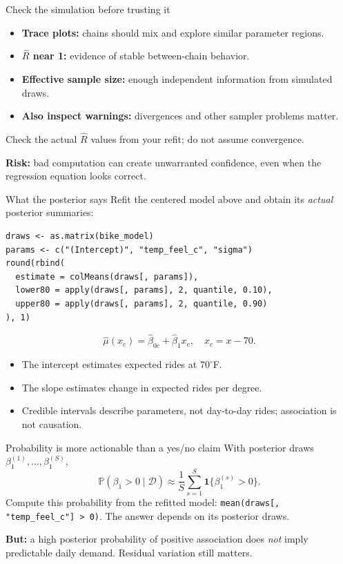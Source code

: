 \documentclass[aspectratio=43,11pt]{beamer}
\newcommand{\Prob}{\mathbb{P}}
\newcommand{\dd}{\mathcal D}
\begin{document}
\begin{frame}{Check the simulation before trusting it}
\begin{itemize}
\item \textbf{Trace plots:} chains should mix and explore similar parameter regions.
\item \textbf{$\widehat R$ near 1:} evidence of stable between-chain behavior.
\item \textbf{Effective sample size:} enough independent information from simulated draws.
\item \textbf{Also inspect warnings:} divergences and other sampler problems matter.
\end{itemize}
Check the actual $\widehat R$ values from your refit; do not assume convergence.
\par\medskip\textbf{Risk:} bad computation can create unwarranted confidence, even when the regression equation looks correct.
\end{frame}

\begin{frame}[fragile]{What the posterior says}
\small
Refit the centered model above and obtain its \emph{actual} posterior summaries:
\begin{verbatim}
draws <- as.matrix(bike_model)
params <- c("(Intercept)", "temp_feel_c", "sigma")
round(rbind(
  estimate = colMeans(draws[, params]),
  lower80 = apply(draws[, params], 2, quantile, 0.10),
  upper80 = apply(draws[, params], 2, quantile, 0.90)
), 1)
\end{verbatim}
\[\widehat\mu(x_c)=\widehat\beta_{0c}+\widehat\beta_1x_c,\quad x_c=x-70.\]
\begin{itemize}
\item The intercept estimates expected rides at $70^\circ$F.
\item The slope estimates change in expected rides per degree.
\item Credible intervals describe parameters, not day-to-day rides; association is not causation.
\end{itemize}
\end{frame}

\begin{frame}{Probability is more actionable than a yes/no claim}
With posterior draws $\beta_1^{(1)},\ldots,\beta_1^{(S)}$,
\[\Prob(\beta_1>0\mid\dd)\approx\frac1S\sum_{s=1}^{S}\mathbf 1\{\beta_1^{(s)}>0\}.\]
Compute this probability from the refitted model: \texttt{mean(draws[, "temp\_feel\_c"] > 0)}. The answer depends on its posterior draws.
\par\medskip\textbf{But:} a high posterior probability of positive association does \emph{not} imply predictable daily demand. Residual variation still matters.
\end{frame}
\end{document}
